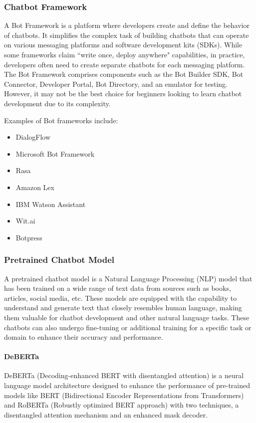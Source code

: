 \documentclass[12pt,oneside,openright,a4paper]{cpe-english-project}
\begin{document}
    \subsubsection{Chatbot Framework}
      \qquad A Bot Framework is a platform where developers create and define the behavior of chatbots. It simplifies the complex task of building chatbots that can operate on various messaging platforms and software development kits (SDKs). While some frameworks claim “write once, deploy anywhere" capabilities, in practice, developers often need to create separate chatbots for each messaging platform. The Bot Framework comprises components such as the Bot Builder SDK, Bot Connector, Developer Portal, Bot Directory, and an emulator for testing. However, it may not be the best choice for beginners looking to learn chatbot development due to its complexity.\par
      \qquad Examples of Bot frameworks include:\par
      \begin{itemize}
        \item DialogFlow
        \item Microsoft Bot Framework
        \item Rasa
        \item Amazon Lex
        \item IBM Watson Assistant
        \item Wit.ai
        \item Botpress
      \end{itemize}
    
    \subsubsection{ Pretrained Chatbot Model}
      \qquad A pretrained chatbot model is a Natural Language Processing (NLP) model that has been trained on a wide range of text data from sources such as books, articles, social media, etc. These models are equipped with the capability to understand and generate text that closely resembles human language, making them valuable for chatbot development and other natural language tasks. These chatbots can also undergo fine-tuning or additional training for a specific task or domain to enhance their accuracy and performance.\par
      \paragraph{DeBERTa \\}
        \quad DeBERTa (Decoding-enhanced BERT with disentangled attention) is a neural language model architecture designed to enhance the performance of pre-trained models like BERT (Bidirectional Encoder Representations from Transformers) and RoBERTa (Robustly optimized BERT approach) with two techniques, a disentangled attention mechanism and an enhanced mask decoder.\par
\end{document}
